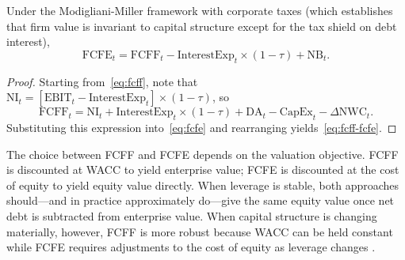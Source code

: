 \begin{deepdive}
\begin{proposition}
\label{prop:fcff-fcfe-relation}
Under the Modigliani-Miller framework with corporate taxes (which establishes that firm value is invariant to capital structure except for the tax shield on debt interest),
\begin{equation}
\label{eq:fcff-fcfe}
\mathrm{FCFE}_t = \mathrm{FCFF}_t - \mathrm{InterestExp}_t \times (1 - \tau) + \mathrm{NB}_t.
\end{equation}
\end{proposition}

\begin{proof}
Starting from~\eqref{eq:fcff}, note that $\mathrm{NI}_t = [\mathrm{EBIT}_t - \mathrm{InterestExp}_t] \times (1 - \tau)$, so
\[
\mathrm{FCFF}_t = \mathrm{NI}_t + \mathrm{InterestExp}_t\times(1-\tau) + \mathrm{DA}_t - \mathrm{CapEx}_t - \Delta\mathrm{NWC}_t.
\]
Substituting this expression into~\eqref{eq:fcfe} and rearranging yields~\eqref{eq:fcff-fcfe}.
\end{proof}

The choice between FCFF and FCFE depends on the valuation objective. FCFF is discounted
at WACC to yield enterprise value; FCFE is discounted at the cost of equity to yield
equity value directly. When leverage is stable, both approaches should---and in practice
approximately do---give the same equity value once net debt is subtracted from enterprise
value. When capital structure is changing materially, however, FCFF is more robust
because WACC can be held constant while FCFE requires adjustments to the cost of equity
as leverage changes \citep{damodaran2012investment}.


\end{deepdive}
